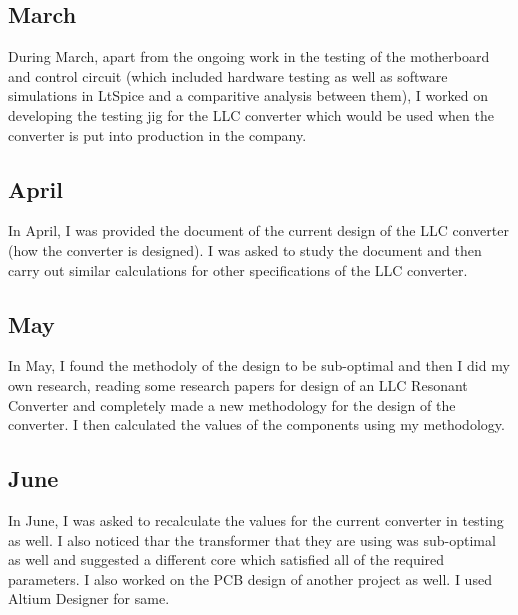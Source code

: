 \subsection{March}
During March, apart from the ongoing work in the testing of the motherboard and
control circuit (which included hardware testing as well as software simulations in LtSpice
and a comparitive analysis between them), I worked on developing the testing jig
for the LLC converter which would be used when the converter is put into production
in the company.

\subsection{April}
In April, I was provided the document of the current design of the LLC converter (how the
converter is designed). I was asked to study the document and then carry out similar calculations
for other specifications of the LLC converter.

\subsection{May}
In May, I found the methodoly of the design to be sub-optimal and then I did my own research,
reading some research papers for design of an LLC Resonant Converter and completely made
a new methodology for the design of the converter. I then calculated the values of the components
using my methodology.

\subsection{June}
In June, I was asked to recalculate the values for the current converter in testing as well.
I also noticed thar the transformer that they are using was sub-optimal as well and suggested
a different core which satisfied all of the required parameters.
I also worked on the PCB design of another project as well. I used Altium Designer for same.